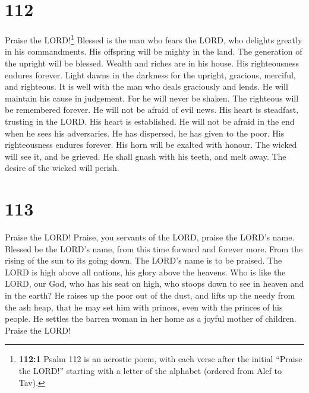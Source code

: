 \hypertarget{section-104}{%
\section{112}\label{section-104}}

 Praise the LORD!\footnote{\textbf{112:1} Psalm 112 is an
  acrostic poem, with each verse after the initial ``Praise the LORD!''
  starting with a letter of the alphabet (ordered from Alef to Tav).}
Blessed is the man who fears the LORD, who delights greatly in his
commandments.  His offspring will be mighty in the land.
The generation of the upright will be blessed.  Wealth and
riches are in his house. His righteousness endures forever.
 Light dawns in the darkness for the upright, gracious,
merciful, and righteous.  It is well with the man who
deals graciously and lends. He will maintain his cause in judgement.
 For he will never be shaken. The righteous will be
remembered forever.  He will not be afraid of evil news.
His heart is steadfast, trusting in the LORD.  His heart
is established. He will not be afraid in the end when he sees his
adversaries.  He has dispersed, he has given to the poor.
His righteousness endures forever. His horn will be exalted with honour.
 The wicked will see it, and be grieved. He shall gnash
with his teeth, and melt away. The desire of the wicked will perish.

\hypertarget{section-105}{%
\section{113}\label{section-105}}

 Praise the LORD! Praise, you servants of the LORD, praise
the LORD's name.  Blessed be the LORD's name, from this
time forward and forever more.  From the rising of the sun
to its going down, The LORD's name is to be praised.  The
LORD is high above all nations, his glory above the heavens.
 Who is like the LORD, our God, who has his seat on high,
 who stoops down to see in heaven and in the earth?
 He raises up the poor out of the dust, and lifts up the
needy from the ash heap,  that he may set him with
princes, even with the princes of his people.  He settles
the barren woman in her home as a joyful mother of children. Praise the
LORD!

